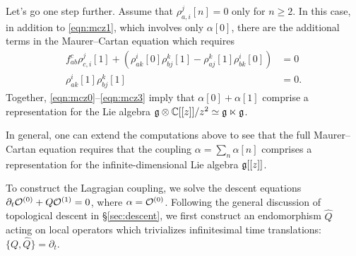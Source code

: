 \documentclass[11pt]{amsart}
\begin{document}
Let's go one step further. 
Assume that $\rho_{a,i}^j [n] = 0$ only for $n \geq 2$. 
In this case, in addition to \eqref{eqn:mcz1}, which involves only $\alpha[0]$, there are the additional terms in the Maurer--Cartan equation which requires
\begin{align}
\label{eqn:mcz1}
f_{ab}^c \rho_{c,i}^{j} [1] + (\rho_{ak}^i [0] \rho_{bj}^k [1] - \rho_{aj}^k [1] \rho^i_{bk} [0]) & = 0 \\
\rho_{ak}^i [1] \rho_{bj}^k [1]  & = 0 .
\label{eqn:mcz3}
\end{align}
Together, \eqref{eqn:mcz0}--\eqref{eqn:mcz3} imply that $\alpha[0] + \alpha[1]$ comprise a representation for the Lie algebra $\mathfrak g \otimes \mathbb C[[z]]/z^2 \simeq \mathfrak g \ltimes \mathfrak g$. 

In general, one can extend the computations above to see that the full Maurer--Cartan equation requires that the coupling $\alpha = \sum_n \alpha[n]$ comprises a representation for the infinite-dimensional Lie algebra $\mathfrak g[[z]]$.  
%


To construct the Lagragian coupling, we solve the descent equations $\partial_t \mathcal O^{(0)} + Q \mathcal O^{(1)} = 0$, where $\alpha = \mathcal O^{(0)}$. 
Following the general discussion of topological descent in \S \ref{sec:descent}, we first construct an endomorphism $\hat{Q}$ acting on local operators which trivializes infinitesimal time translations: $\{Q, \hat{Q}\} = \partial_t$. 
\end{document}
